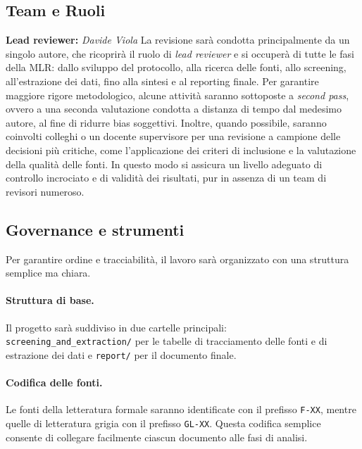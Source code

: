\documentclass[a4paper,9pt]{article}
\begin{document}
	\subsection{Team e Ruoli }
	\textbf{Lead reviewer:} \emph{Davide Viola}\newline
	La revisione sarà condotta principalmente da un singolo autore, che ricoprirà il ruolo di \emph{lead reviewer} e si occuperà di tutte le fasi della MLR: dallo sviluppo del protocollo, alla ricerca delle fonti, allo screening, all’estrazione dei dati, fino alla sintesi e al reporting finale.\newline
	Per garantire maggiore rigore metodologico, alcune attività saranno sottoposte a \emph{second pass}, ovvero a una seconda valutazione condotta a distanza di tempo dal medesimo autore, al fine di ridurre bias soggettivi. Inoltre, quando possibile, saranno coinvolti colleghi o un docente supervisore per una revisione a campione delle decisioni più critiche, come l’applicazione dei criteri di inclusione e la valutazione della qualità delle fonti.\newline
	In questo modo si assicura un livello adeguato di controllo incrociato e di validità dei risultati, pur in assenza di un team di revisori numeroso.

	
	\subsection{Governance e strumenti}
	
	Per garantire ordine e tracciabilità, il lavoro sarà organizzato con una struttura semplice ma chiara.
	
	\paragraph{Struttura di base.} 
	Il progetto sarà suddiviso in due cartelle principali:\\  
	\texttt{screening\_and\_extraction/} per le tabelle di tracciamento delle fonti e di estrazione dei dati e \texttt{report/} per il documento finale.
	
	\paragraph{Codifica delle fonti.}
	Le fonti della letteratura formale saranno identificate con il prefisso \texttt{F-XX}, mentre quelle di letteratura grigia con il prefisso \texttt{GL-XX}. 
	Questa codifica semplice consente di collegare facilmente ciascun documento alle fasi di analisi.
	
\end{document}
